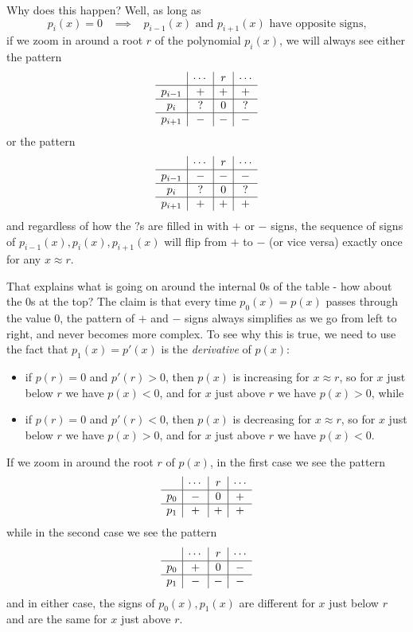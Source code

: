 Why does this happen? Well, as long as
\[
p_i(x) = 0 \;\;\; \implies \;\;\; p_{i-1}(x) \text{ and } p_{i+1}(x) \text{ have opposite signs,}
\]
if we zoom in around a root $r$ of the polynomial $p_i(x)$, we will always see either the pattern
\[
\begin{array}{c | c | c | c}
& \cdots & r & \cdots\\
\hline
p_{i-1} & + & + & +\\
\hline
p_i & ? & 0 & ?\\
\hline
p_{i+1} & - & - & -
\end{array}
\]
or the pattern
\[
\begin{array}{c | c | c | c}
& \cdots & r & \cdots\\
\hline
p_{i-1} & - & - & -\\
\hline
p_i & ? & 0 & ?\\
\hline
p_{i+1} & + & + & +
\end{array}
\]
and regardless of how the $?$s are filled in with $+$ or $-$ signs, the sequence of signs of $p_{i-1}(x), p_i(x), p_{i+1}(x)$ will flip from $+$ to $-$ (or vice versa) exactly once for any $x \approx r$.

That explains what is going on around the internal $0$s of the table - how about the $0$s at the top? The claim is that every time $p_0(x) = p(x)$ passes through the value $0$, the pattern of $+$ and $-$ signs always simplifies as we go from left to right, and never becomes more complex. To see why this is true, we need to use the fact that $p_1(x) = p'(x)$ is the \emph{derivative} of $p(x)$:
\begin{itemize}
\item if $p(r) = 0$ and $p'(r) > 0$, then $p(x)$ is increasing for $x \approx r$, so for $x$ just below $r$ we have $p(x) < 0$, and for $x$ just above $r$ we have $p(x) > 0$, while

\item if $p(r) = 0$ and $p'(r) < 0$, then $p(x)$ is decreasing for $x \approx r$, so for $x$ just below $r$ we have $p(x) > 0$, and for $x$ just above $r$ we have $p(x) < 0$.
\end{itemize}
If we zoom in around the root $r$ of $p(x)$, in the first case we see the pattern
\[
\begin{array}{c | c | c | c}
& \cdots & r & \cdots\\
\hline
p_0 & - & 0 & +\\
\hline
p_1 & + & + & +
\end{array}
\]
while in the second case we see the pattern
\[
\begin{array}{c | c | c | c}
& \cdots & r & \cdots\\
\hline
p_0 & + & 0 & -\\
\hline
p_1 & - & - & -
\end{array}
\]
and in either case, the signs of $p_0(x), p_1(x)$ are different for $x$ just below $r$ and are the same for $x$ just above $r$.

